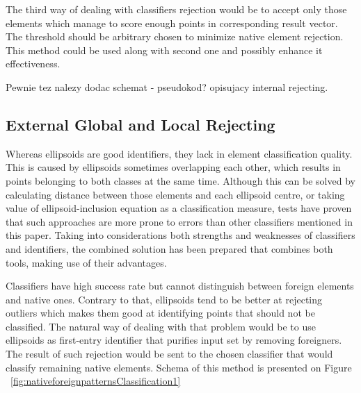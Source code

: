 \documentclass{llncs}
\begin{document}
The third way of dealing with classifiers rejection would be to accept only those elements which manage to score enough points in corresponding result vector. The threshold should be arbitrary chosen to minimize native element rejection. This method could be used along with second one and possibly enhance it effectiveness.

{\color{blue} Pewnie tez nalezy dodac schemat - pseudokod? opisujacy internal rejecting.}

\subsection{External Global and Local Rejecting}
  \label{subsec:GlobalLocalRejecting}

Whereas ellipsoids are good identifiers, they lack in element classification quality. This is caused by ellipsoids sometimes overlapping each other, which results in points belonging to both classes at the same time. Although this can be solved by calculating distance between those elements and each ellipsoid centre, or taking value of ellipsoid-inclusion equation as a classification measure, tests have proven that such approaches are more prone to errors than other classifiers mentioned in this paper. Taking into considerations both strengths and weaknesses of classifiers and identifiers, the combined solution has been prepared that combines both tools, making use of their advantages.

Classifiers have high success rate but cannot distinguish between foreign elements and native ones. Contrary to that, ellipsoids tend to be better at rejecting outliers which makes them good at identifying points that should not be classified. The natural way of dealing with that problem would be to use ellipsoids as first-entry identifier that purifies input set by removing foreigners. The result of such rejection would be sent to the chosen classifier that would classify remaining native elements. Schema of this method is presented on Figure ~\ref{fig:nativeforeignpatternsClassification1}
\end{document}
